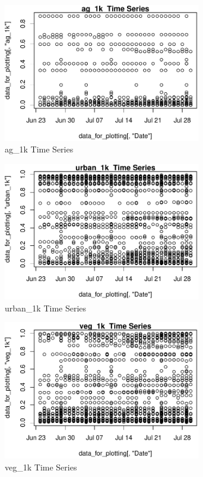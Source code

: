 \begin{figure} 
\centering  
\includegraphics[width=0.77\textwidth]{Code_Outputs/ML_input_report_AllforCaret_cleaned_StepPractice_part_practice_ag_1kTS.pdf} 
\caption{\label{fig:ML_input_report_AllforCaret_cleaned_StepPractice_part_practiceag_1kTS}ag_1k  Time Series} 
\end{figure} 
 

\begin{figure} 
\centering  
\includegraphics[width=0.77\textwidth]{Code_Outputs/ML_input_report_AllforCaret_cleaned_StepPractice_part_practice_urban_1kTS.pdf} 
\caption{\label{fig:ML_input_report_AllforCaret_cleaned_StepPractice_part_practiceurban_1kTS}urban_1k  Time Series} 
\end{figure} 
 

\begin{figure} 
\centering  
\includegraphics[width=0.77\textwidth]{Code_Outputs/ML_input_report_AllforCaret_cleaned_StepPractice_part_practice_veg_1kTS.pdf} 
\caption{\label{fig:ML_input_report_AllforCaret_cleaned_StepPractice_part_practiceveg_1kTS}veg_1k  Time Series} 
\end{figure} 
 


